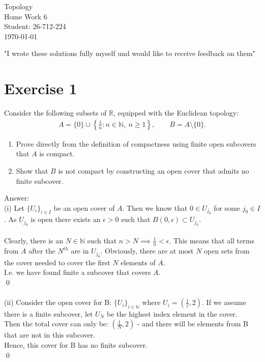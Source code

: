 \documentclass[12pt]{article}
\begin{document}
\begin{titlepage}
\centering
\vspace*{\fill}
{\Huge Topology} \\[0.5cm]
{\Huge Home Work 6}\\[1.5cm]
{\Large Student: 26-712-224}\\[0.5cm]
{\Large \today}\par

\vspace{2cm}
{\normalsize "I wrote these solutions fully myself und would like to receive feedback on them"\par}

\vspace*{\fill}
\end{titlepage}

\newpage
\noindent
\section*{Exercise 1}
\noindent
Consider the following subsets of $\mathbb{R}$, equipped with the Euclidean topology:
\begin{align*}
A=\{0\}\cup\left\{\frac{1}{n}:n\in\mathbb{N},\ n\geq 1\right\},
\qquad B=A\setminus\{0\}.
\end{align*}
\begin{enumerate}[label=\roman*)]
\item Prove directly from the definition of compactness using finite open subcovers that $A$ is compact.
\item Show that $B$ is not compact by constructing an open cover that admits no finite subcover.
\end{enumerate}

\vspace{1cm}
\noindent
Answer:\\
(i) Let $\{U_i\}_{i \in I}$ be an open cover of $A$.
Then we know that $0 \in U_{j_0}$ for some $j_0 \in I$.  As $U_{j_0}$ is open there exists an $\epsilon > 0$
such that $B(0, \epsilon) \subset U_{j_0}$.\\
\\
Clearly, there is an $N \in \mathbb{N}$ such that $n > N \implies \frac{1}{n} < \epsilon$. This means that all terms from $A$
after the $N^{th}$ are in $U_{j_0}$.  Obviously, there are at most $N$ open sets from the cover needed to cover the first $N$ elements of $A$.\\
I.e. we have found finite a subcover that covers $A$.\\
\qed\\
\\
(ii) Consider the open cover for B: $\{U_i\}_{i \in \mathbb{N}}$ where $U_i=(\frac{1}{i}, 2)$.  If we assume there is a finite subcover, let $U_N$ be the highest index element in the cover.\\
Then the total cover can only be: $(\frac{1}{N}, 2)$ - and there will be elements from B that are not in this subcover.\\
Hence, this cover for B has no finite subcover.\\
\qed\\
\end{document}
